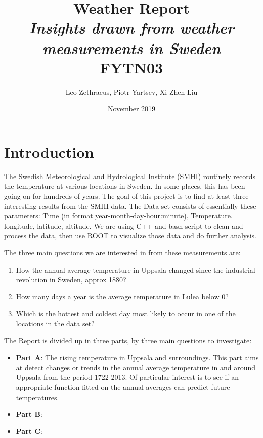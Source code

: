 \documentclass[a4paper]{article}
\begin{document}
\title{Weather Report\\\textit{Insights drawn from weather measurements in Sweden} \\ FYTN03}
\author{Leo Zethraeus, 
Piotr Yartsev, Xi-Zhen Liu} %
\date{November 2019} %
\maketitle
\newpage
\tableofcontents

\newpage

\section{Introduction}
The Swedish Meteorological and Hydrological Institute (SMHI) routinely records the temperature at various locations in Sweden. In some places, this has been going on for hundreds of years. The goal of this project is to find at least three interesting results from the SMHI data. The Data set consists of essentially these parameters: Time (in format year-month-day-hour:minute), Temperature, longitude, latitude, altitude. We are using C++ and bash script to clean and process the data, then use ROOT to visualize those data and do further analysis. 

The three main questions we are interested in from these measurements are:
\begin{enumerate}
\item How the annual average temperature in Uppsala changed since the industrial revolution in Sweden, approx 1880?
\item How many days a year is the average temperature in Lulea below 0?
\item Which is the hottest and coldest day most likely to occur in one of the locations in the data set?
\end{enumerate}

The Report is divided up in three parts, by three main questions to investigate:
\begin{itemize}
\item \textbf{Part A}: The rising temperature in Uppsala and surroundings. This part aims at detect changes or trends in the annual average temperature in and around Uppsala from the period 1722-2013. Of particular interest is to see if an appropriate function fitted on the annual averages can predict future temperatures.\\
\item \textbf{Part B}:

\item \textbf{Part C}:
\end{itemize}
\end{document}
